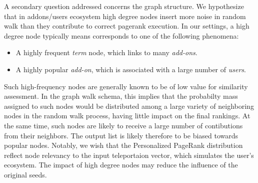 \documentclass[11pt,oneside]{book}
\begin{document}
A secondary question addressed concerns the graph structure. We hypothesize that in addons/users ecosystem high degree nodes insert more noise in random walk than they contribute to correct pagerank execution. In our settings, a high degree node typically means corresponds to one of the following phenomena:
\begin{itemize}
\renewcommand{\labelitemiii}{$\diamond$}
\item A highly frequent {\it term} node, which links to many {\it add-ons}. 
\item A highly popular {\it add-on}, which is associated with a large number of {\it users}. 
\end{itemize}
Such high-frequency nodes are generally known to be of low value for similarity assessment. In the graph walk schema, this implies that the probabilty mass assigned to such nodes would be distributed among a large variety of neighboring nodes in the random walk process, having little impact on the final rankings. At the same time, such nodes are likely to receive a large number of contibutions from their neighbors. The output list is likely therefore to be biased towards popular nodes.  
Notably, we wish that the Personalized PageRank distribution reflect node relevancy to the input
teleportaion vector, which simulates the user's ecosystem. The impact of high degree nodes may reduce the
influence of the original seeds.
\end{document}

